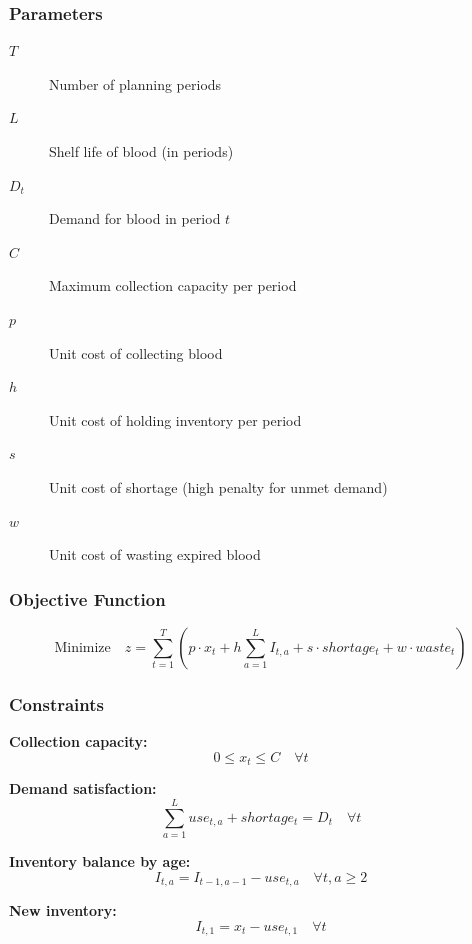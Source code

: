 \documentclass{KPS_assignment}
\begin{document}
\subsubsection*{Parameters}
\begin{description}
    \item[$T$] Number of planning periods
    \item[$L$] Shelf life of blood (in periods)
    \item[$D_t$] Demand for blood in period $t$
    \item[$C$] Maximum collection capacity per period
    \item[$p$] Unit cost of collecting blood
    \item[$h$] Unit cost of holding inventory per period
    \item[$s$] Unit cost of shortage (high penalty for unmet demand)
    \item[$w$] Unit cost of wasting expired blood
\end{description}

\subsubsection*{Objective Function}
\begin{equation}
\text{Minimize} \quad z = \sum_{t=1}^{T} \left( p \cdot x_t + h \sum_{a=1}^{L} I_{t,a} + s \cdot shortage_t + w \cdot waste_t \right)
\end{equation}

\subsubsection*{Constraints}

\textbf{Collection capacity:}
\begin{equation}
0 \leq x_t \leq C \quad \forall t
\end{equation}

\textbf{Demand satisfaction:}
\begin{equation}
\sum_{a=1}^{L} use_{t,a} + shortage_t = D_t \quad \forall t
\end{equation}

\textbf{Inventory balance by age:}
\begin{equation}
I_{t,a} = I_{t-1,a-1} - use_{t,a} \quad \forall t, a \geq 2
\end{equation}

\textbf{New inventory:}
\begin{equation}
I_{t,1} = x_t - use_{t,1} \quad \forall t
\end{equation}
\end{document}
